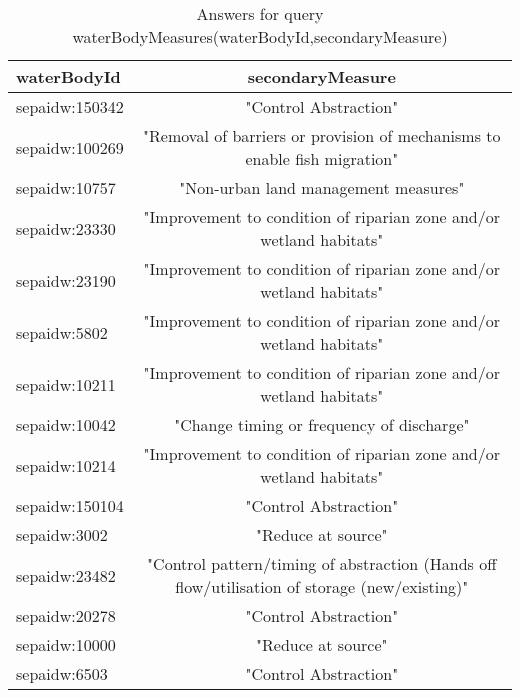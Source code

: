 \documentclass[a4paper,10pt]{article}
\begin{document}
\begin{table}[!tb]
\caption{Answers for query waterBodyMeasures(waterBodyId,secondaryMeasure) }	
\begin{center}	
\begin{tabular}{ l c}
\hline
	waterBodyId & secondaryMeasure \\ \hline
 sepaidw:150342 & "Control Abstraction"    \\                                                                     
 sepaidw:100269 & "Removal of barriers or provision of mechanisms to enable fish migration"   \\                  
 sepaidw:10757  & "Non-urban land management measures"      \\                                                    
 sepaidw:23330  & "Improvement to condition of riparian zone and/or wetland habitats"    \\                       
 sepaidw:23190  & "Improvement to condition of riparian zone and/or wetland habitats"  \\                         
 sepaidw:5802   & "Improvement to condition of riparian zone and/or wetland habitats"  \\                         
 sepaidw:10211  & "Improvement to condition of riparian zone and/or wetland habitats"       \\                    
 sepaidw:10042  & "Change timing or frequency of discharge"         \\                                            
 sepaidw:10214  & "Improvement to condition of riparian zone and/or wetland habitats"   \\                        
 sepaidw:150104 & "Control Abstraction"    \\                                                                     
 sepaidw:3002   & "Reduce at source"    \\                                                                         
 sepaidw:23482  & "Control pattern/timing of abstraction (Hands off flow/utilisation of storage (new/existing)" \\ 
 sepaidw:20278  & "Control Abstraction"      \\                                                                    
sepaidw:10000  & "Reduce at source"    \\                                                                         
 sepaidw:6503   & "Control Abstraction"   \\                                                                       

\end{tabular}
\end{center}
\end{table}
\end{document}

